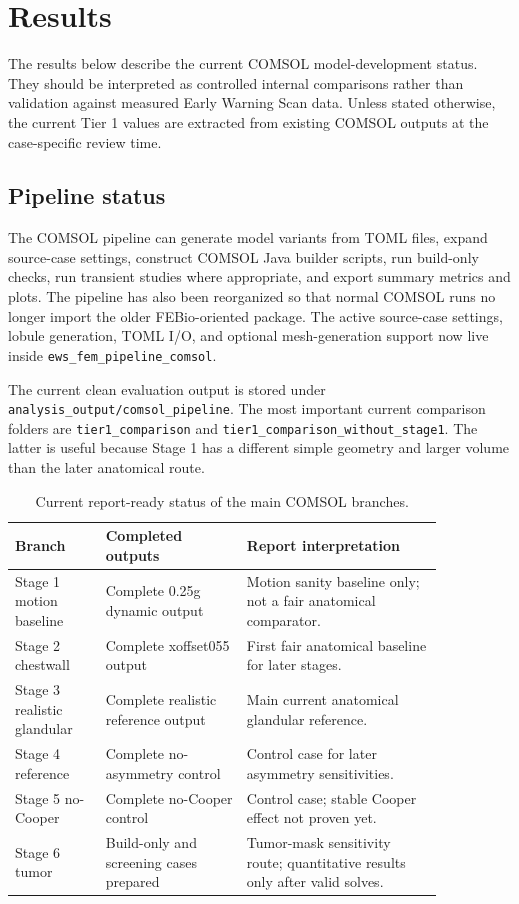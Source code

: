 \section{Results}

The results below describe the current COMSOL model-development status. They should be interpreted as controlled internal comparisons rather than validation against measured Early Warning Scan data. Unless stated otherwise, the current Tier 1 values are extracted from existing COMSOL outputs at the case-specific review time.

\subsection{Pipeline status}

The COMSOL pipeline can generate model variants from TOML files, expand source-case settings, construct COMSOL Java builder scripts, run build-only checks, run transient studies where appropriate, and export summary metrics and plots. The pipeline has also been reorganized so that normal COMSOL runs no longer import the older FEBio-oriented package. The active source-case settings, lobule generation, TOML I/O, and optional mesh-generation support now live inside \texttt{ews\_fem\_pipeline\_comsol}.

The current clean evaluation output is stored under \texttt{analysis\_output/comsol\_pipeline}. The most important current comparison folders are \texttt{tier1\_comparison} and \texttt{tier1\_comparison\_without\_stage1}. The latter is useful because Stage 1 has a different simple geometry and larger volume than the later anatomical route.

\begin{table}[H]
\centering
\small
\caption{Current report-ready status of the main COMSOL branches.}
\label{tab:completed_branches}
\begin{tabular}{p{0.18\linewidth} p{0.28\linewidth} p{0.39\linewidth}}
\toprule
Branch & Completed outputs & Report interpretation \\
\midrule
Stage 1 motion baseline & Complete 0.25g dynamic output & Motion sanity baseline only; not a fair anatomical comparator. \\
Stage 2 chestwall & Complete xoffset055 output & First fair anatomical baseline for later stages. \\
Stage 3 realistic glandular & Complete realistic reference output & Main current anatomical glandular reference. \\
Stage 4 reference & Complete no-asymmetry control & Control case for later asymmetry sensitivities. \\
Stage 5 no-Cooper & Complete no-Cooper control & Control case; stable Cooper effect not proven yet. \\
Stage 6 tumor & Build-only and screening cases prepared & Tumor-mask sensitivity route; quantitative results only after valid solves. \\
\bottomrule
\end{tabular}
\end{table}

